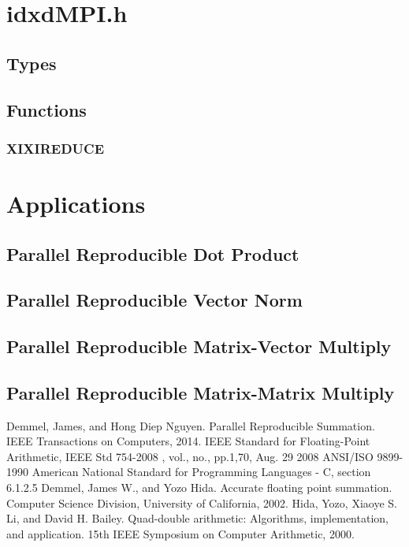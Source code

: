 \documentclass[12pt]{article}
\theoremstyle{plain}
\begin{document}
\section{idxdMPI.h}
  \subsection{Types}
  \subsection{Functions}
    \subsubsection{XIXIREDUCE}
\section{Applications}
  \subsection{Parallel Reproducible Dot Product}
  \subsection{Parallel Reproducible Vector Norm}
  \subsection{Parallel Reproducible Matrix-Vector Multiply}
  \subsection{Parallel Reproducible Matrix-Matrix Multiply}
\begin{thebibliography}{9}
    Demmel, James, and Hong Diep Nguyen. Parallel Reproducible Summation. IEEE Transactions on Computers, 2014.
    IEEE Standard for Floating-Point Arithmetic, IEEE Std 754-2008 , vol., no., pp.1,70, Aug. 29 2008
    ANSI/ISO 9899-1990 American National Standard for Programming Languages - C, section 6.1.2.5
    Demmel, James W., and Yozo Hida. Accurate floating point summation. Computer Science Division, University of California, 2002.
    Hida, Yozo, Xiaoye S. Li, and David H. Bailey. Quad-double arithmetic: Algorithms, implementation, and application. 15th IEEE Symposium on Computer Arithmetic, 2000.
\end{thebibliography}
\end{document}
